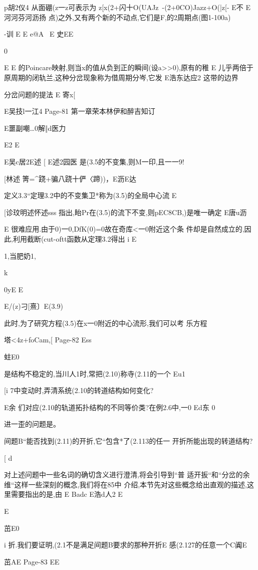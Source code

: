 {{p胡2仪4
从面硼(z一z可表示为
z[x(2+闪十O(UAJz~-(2+0CO)Jazz+O(|z[-
E不
E河河芬河沥扬
点)之外,又有两个新的不动点,它们是F,的2周期点(图1-100a)

-训
E
E
e@A
\
E
史EE

0

E
E
的Poincare映射,则当x的值从负到正的瞬间(设a>>0),原有的稚
E
儿乎两倍于原周期的闭轨兰,这种分岔现象称为借周期分岑,它发
E浩东达应2
这带的边界

分岔问题的提法
E
寄x[

E吴技l一江4
Page-81
第一章荣本林伊和醉吉知订

E噩副嘲…0解‖d医力

E2
E

E吴c居2E述
[
E述2园医
是(3.5的不变集,则M一印,且一一9!

[林述
箐=^跷+骗八跷十俨〈蹄))，E沥E达

定义3.3“定理3.2中的不变集卫*称为(3.5)的全局中心流
E

[诊玟明述怀述sss
指出,眙Pr在(3.5)的流下不变,则pEC8CB,)是唯一确定
E唐u沥

E
很难应用.由于0)一0,DfK(0)=0故在奇库<一0附近这个条
件却是自然成立的,因此,利用截断(cut-oftt函数从定理3.2得出
i
E

1,当肥奶1,

k{0yE
E

E/(z)刁[熹〕E(3.9)

此时,为了研究方程(3.5)在x一0附近的中心流形,我们可以考
乐方程

塔<4z+foCam,[
Page-82
Ess

蛀E0

是结构不稳定的,当川人1时,常把(2.10)称寺(2.11的一个
Eu1

[i
7中变动时,弄清系统(2.10的转道结构如何变化?

E余
们对应(2.10的轨道拓扑结构的不同等价类?在例2.6中,一0
Ed东
0

进一歪的问题是。

间题B“能否找到(2.11)的开折,它“包含*了(2.113的任一
开折所能出现的转道结构?

[
d

对上述问题中一些名词的确切含义进行澄清,将会引导到“普
适开扳“和“分岔的余维“这样一些深刻的概念,我们将在85中
介绍,本节先对这些概念给出直观的描述,这里需要指出的是,由
E
Badc
E浩d人2
E

E

茁E0

i
折.我们要证明,(2.1不是满足间题B要求的那种开折E
感(2.127的任意一个C阗E

茁AE
Page-83
EE

}}}
